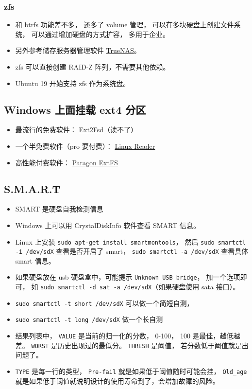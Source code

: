 \subsubsection{zfs}
\begin{itemize}
\item 和 btrfs 功能差不多， 还多了 volume 管理， 可以在多块硬盘上创建文件系统， 可以通过增加硬盘的方式扩容， 多用于企业。
\item 另外参考储存服务器管理软件 \href{https://www.truenas.com/truenas-core/}{TrueNAS}。
\item zfs 可以直接创建 RAID-Z 阵列，不需要其他依赖。
\item Ubuntu 19 开始支持 zfs 作为系统盘。
\end{itemize}


\subsection{Windows 上面挂载 ext4 分区}
\begin{itemize}
\item 最流行的免费软件： \href{https://sourceforge.net/projects/ext2fsd/}{Ext2Fsd}（读不了）
\item 一个半免费软件（pro 要付费）： \href{https://www.diskinternals.com/linux-reader/}{Linux Reader}
\item 高性能付费软件： \href{https://www.paragon-software.com/business/extfs-for-windows/}{Paragon ExtFS}
\end{itemize}

\subsection{S.M.A.R.T}
\begin{itemize}
\item SMART 是硬盘自我检测信息
\item Windows 上可以用 CrystalDiskInfo 软件查看 SMART 信息。
\item Linux 上安装 \verb`sudo apt-get install smartmontools`， 然后 \verb`sudo smartctl -i /dev/sdX` 查看是否开启了 smart， \verb`sudo smartctl -a /dev/sdX` 查看具体 smart 信息。
\item 如果硬盘放在 usb 硬盘盒中，可能提示 \verb`Unknown USB bridge`， 加一个选项即可， 如 \verb`sudo smartctl -d sat -a /dev/sdX`（如果硬盘使用 sata 接口）。
\item \verb`sudo smartctl -t short /dev/sdX` 可以做一个简短自测，
\item \verb`sudo smartctl -t long /dev/sdX` 做一个长自测
\item 结果列表中， \verb`VALUE` 是当前的归一化的分数， 0-100， 100 是最佳，越低越差。 \verb`WORST` 是历史出现过的最低分。 \verb`THRESH` 是阈值， 若分数低于阈值就是出问题了。
\item \verb`TYPE` 是每一行的类型， \verb`Pre-fail` 就是如果低于阈值随时可能会挂， \verb`Old_age` 就是如果低于阈值就说明设计的使用寿命到了，会增加故障的风险。
\end{itemize}


